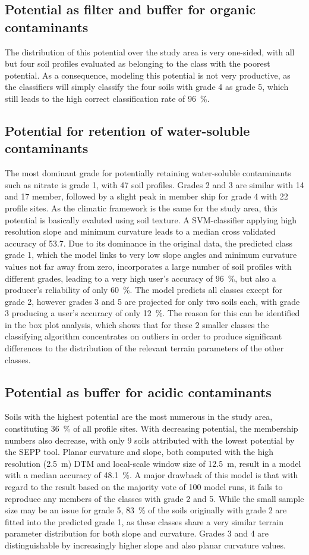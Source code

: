 \documentclass[soilsystems,article,submit,moreauthors,pdftex,10pt,a4paper]{Definitions/mdpi}
\begin{document}
\subsection{Potential as  filter and buffer for organic contaminants}
The distribution of this potential over the study area is very one-sided, with all but four soil profiles evaluated as belonging to the class with the poorest potential. As a consequence, modeling this potential is not very productive, as the classifiers will simply classify the four soils with grade 4 as grade 5, which still leads to the high correct classification rate of 96~\%.
\subsection{Potential for retention of water-soluble contaminants}
The most dominant grade for potentially retaining water-soluble contaminants such as nitrate is grade 1, with 47 soil profiles. Grades 2 and 3  are similar with 14 and 17 member, followed by a slight peak in member ship for grade 4 with 22 profile sites. As the climatic framework is the same for the study area, this potential is basically evaluted using soil texture. A SVM-classifier applying high resolution slope and minimum curvature leads to a median cross validated accuracy of 53.7. Due to its dominance in the original data,  the predicted class grade 1, which the model links to very low slope angles and minimum curvature values not far away from zero, incorporates a large number of soil profiles with different grades, leading to a very high user's accuracy of 96~\%, but also a producer's reliability of only 60~\%. The model predicts all classes except for grade 2, however grades 3 and 5 are projected for only two soils each, with grade 3 producing a user's accuracy of only 12~\%. The reason for this can be identified in the  box plot analysis, which shows that for these 2 smaller classes the classifying algorithm concentrates on outliers in order to produce significant differences to the distribution of the relevant terrain parameters of the other classes.
\subsection{Potential as buffer for acidic contaminants}
Soils with the highest potential are the most numerous in the study area, constituting 36~\% of all profile sites. With decreasing potential, the membership numbers also decrease, with only 9 soils attributed with the lowest potential by the SEPP tool. Planar curvature and slope, both computed with the high resolution (2.5~m) DTM and local-scale window size of 12.5~m, result in a model with a median accuracy of 48.1~\%. A major drawback of this model is that with regard to the result based on the majority vote of 100 model runs, it fails to reproduce any members of the classes with grade 2 and 5. While the small sample size may be an issue for grade 5, 83~\% of the soils originally with grade 2 are  fitted into the predicted grade 1, as these classes share a very similar terrain parameter distribution for both slope and curvature.  Grades 3 and 4 are distinguishable by increasingly higher slope and also planar curvature values.
\end{document}

